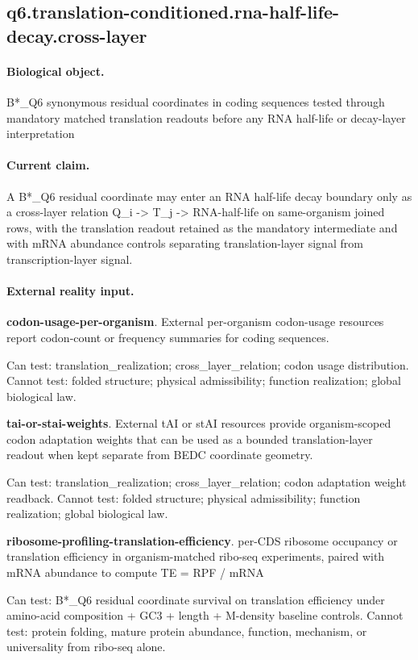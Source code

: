 \subsection{q6.translation-conditioned.rna-half-life-decay.cross-layer}

\paragraph{Biological object.} B*\_Q6 synonymous residual coordinates in coding sequences tested through mandatory matched translation readouts before any RNA half-life or decay-layer interpretation

\paragraph{Current claim.} A B*\_Q6 residual coordinate may enter an RNA half-life decay boundary only as a cross-layer relation Q\_i -> T\_j -> RNA-half-life on same-organism joined rows, with the translation readout retained as the mandatory intermediate and with mRNA abundance controls separating translation-layer signal from transcription-layer signal.

\paragraph{External reality input.}
\textbf{codon-usage-per-organism}. External per-organism codon-usage resources report codon-count or frequency summaries for coding sequences.

Can test: translation\_realization; cross\_layer\_relation; codon usage distribution. Cannot test: folded structure; physical admissibility; function realization; global biological law.

\textbf{tai-or-stai-weights}. External tAI or stAI resources provide organism-scoped codon adaptation weights that can be used as a bounded translation-layer readout when kept separate from BEDC coordinate geometry.

Can test: translation\_realization; cross\_layer\_relation; codon adaptation weight readback. Cannot test: folded structure; physical admissibility; function realization; global biological law.

\textbf{ribosome-profiling-translation-efficiency}. per-CDS ribosome occupancy or translation efficiency in organism-matched ribo-seq experiments, paired with mRNA abundance to compute TE = RPF / mRNA

Can test: B*\_Q6 residual coordinate survival on translation efficiency under amino-acid composition + GC3 + length + M-density baseline controls. Cannot test: protein folding, mature protein abundance, function, mechanism, or universality from ribo-seq alone.

